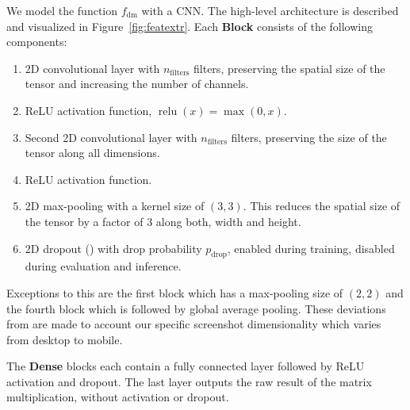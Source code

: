 We model the function $f_\text{dm}$ with a CNN. The high-level architecture is described and visualized in Figure~\ref{fig:featextr}. Each \textbf{Block} consists of the following components:
\begin{enumerate}
    \item 2D convolutional layer with $n_\text{filters}$ filters, preserving the spatial size of the tensor and increasing the number of channels.
    \item ReLU activation function, $\operatorname{relu}(x)=\max(0,x)$.
    \item Second 2D convolutional layer with $n_\text{filters}$ filters, preserving the size of the tensor along all dimensions.
    \item ReLU activation function.
    \item 2D max-pooling with a kernel size of $(3,3)$. This reduces the spatial size of the tensor by a factor of $3$ along both, width and height.
    \item 2D dropout (\cite{srivastava2014:dropout}) with drop probability $p_\text{drop}$, enabled during training, disabled during evaluation and inference.
\end{enumerate}
Exceptions to this are the first block which has a max-pooling size of $(2,2)$ and the fourth block which is followed by global average pooling. These deviations from \cite{beltramelli:pix2code} are made to account our specific screenshot dimensionality which varies from desktop to mobile.

The \textbf{Dense} blocks each contain a fully connected layer followed by ReLU activation and dropout. The last layer outputs the raw result of the matrix multiplication, without activation or dropout.

